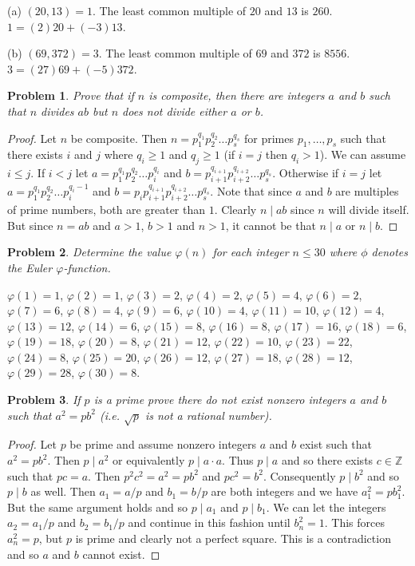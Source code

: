 \documentclass{article}
\newtheorem{problem}{Problem}
\begin{document}
(a) $(20, 13) = 1$. The least common multiple of $20$ and $13$ is $260$. $1 = (2)20 + (-3)13$.\newline

(b) $(69, 372) = 3$. The least common multiple of $69$ and $372$ is $8556$. $3 = (27)69 + (-5)372$.


\begin{problem}
Prove that if $n$ is composite, then there are integers $a$ and $b$ such that $n$ divides $ab$ but $n$ does not divide either $a$ or $b$.
\end{problem}
\begin{proof}
Let $n$ be composite. Then $n = p_1^{q_1}p_2^{q_2}\dots p_s^{q_s}$ for primes $p_1, \dots , p_s$ such that there exists $i$ and $j$ where $q_i \geq 1$ and $q_j \geq 1$ (if $i = j$ then $q_i > 1$). We can assume $i \leq j$. If $i < j$ let $a = p_1^{q_1}p_2^{q_2}\dots p_i^{q_i}$ and $b = p_{i+1}^{q_{i+1}}p_{i+2}^{q_{i+2}}\dots p_s^{q_s}$. Otherwise if $i =j$ let $a = p_1^{q_1}p_2^{q_2}\dots p_i^{q_i-1}$ and $b = p_{i}p_{i+1}^{q_{i+1}}p_{i+2}^{q_{i+2}}\dots p_s^{q_s}$. Note that since $a$ and $b$ are multiples of prime numbers, both are greater than $1$. Clearly $n \mid ab$ since $n$ will divide itself. But since $n = ab$ and $a > 1$, $b > 1$ and $n > 1$, it cannot be that $n \mid a$ or $n \mid b$.
\end{proof}

\begin{problem}
Determine the value $\varphi(n)$ for each integer $n \leq 30$ where $\phi$ denotes the Euler $\varphi$-function.
\end{problem}

$\varphi(1) = 1$, $\varphi(2) = 1$, $\varphi(3) = 2$, $\varphi(4) = 2$, $\varphi(5) = 4$, $\varphi(6) = 2$, $\varphi(7) = 6$, $\varphi(8) = 4$, $\varphi(9) = 6$, $\varphi(10) = 4$, $\varphi(11) = 10$, $\varphi(12) = 4$, $\varphi(13) = 12$, $\varphi(14) = 6$, $\varphi(15) = 8$, $\varphi(16) = 8$, $\varphi(17) = 16$, $\varphi(18) = 6$, $\varphi(19) = 18$, $\varphi(20) = 8$, $\varphi(21) = 12$, $\varphi(22) = 10$, $\varphi(23) = 22$, $\varphi(24) = 8$, $\varphi(25) = 20$, $\varphi(26) = 12$, $\varphi(27) = 18$, $\varphi(28) = 12$, $\varphi(29) = 28$, $\varphi(30) = 8$.


\begin{problem}
If $p$ is a prime prove there do not exist nonzero integers $a$ and $b$ such that $a^2 = pb^2$ (i.e. $\sqrt{p}$ is not a rational number).
\end{problem}
\begin{proof}
Let $p$ be prime and assume nonzero integers $a$ and $b$ exist such that $a^2 = pb^2$. Then $p \mid a^2$ or equivalently $p \mid a \cdot a$. Thus $p \mid a$ and so there exists $c \in \mathbb{Z}$ such that $pc = a$. Then $p^2c^2 = a^2 = pb^2$ and $pc^2 = b^2$. Consequently $p \mid b^2$ and so $p \mid b$ as well. Then $a_1 = a/p$ and $b_1 = b/p$ are both integers and we have $a_1^2 = pb_1^2$. But the same argument holds and so $p \mid a_1$ and $p \mid b_1$. We can let the integers $a_2 = a_1/p$ and $b_2 = b_1/p$ and continue in this fashion until $b_n^2 = 1$. This forces $a_n^2 = p$, but $p$ is prime and clearly not a perfect square. This is a contradiction and so $a$ and $b$ cannot exist.
\end{proof}
\end{document}
